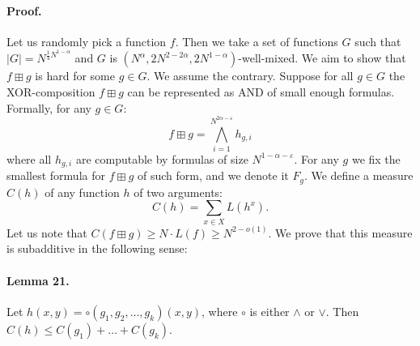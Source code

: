 \paragraph{Proof.} Let us randomly pick a function $f$. Then we take a set of functions $G$ such that $|G|=N^{\frac14 N^{1-\alpha}}$ and $G$ is $(N^\alpha,2N^{2-2\alpha},2N^{1-\alpha})$-well-mixed. We aim to show that $f\boxplus g$ is hard for some $g\in G$.
We assume the contrary. Suppose for all $g\in G$ the XOR-composition $f\boxplus g$ can be represented as AND of small enough formulas. Formally, for any $g\in G$:
\[f\boxplus g=\bigwedge_{i=1}^{N^{2\alpha-\varepsilon}}h_{g,i}\]
where all $h_{g,i}$ are computable by formulas of size $N^{1-\alpha-\varepsilon}$. For any $g$ we fix the smallest formula for $f\boxplus g$ of such form, and we denote it $F_g$.
We define a measure $C(h)$ of any function $h$ of two arguments:
\[C(h)=\sum_{x\in X}L(h^x).\]
Let us note that $C(f\boxplus g)\geq N\cdot L(f)\geq N^{2-o(1)}$. We prove that this measure is subadditive in the following sense:
\paragraph{Lemma 21.} Let $h(x,y)=\circ(g_1,g_2,\ldots,g_k)(x,y)$, where $\circ$ is either $\wedge$ or $\vee$. Then $C(h)\leq C(g_1)+\ldots+C(g_k)$.
